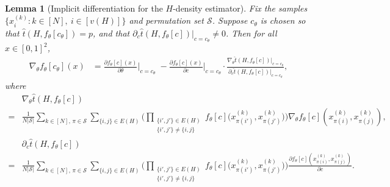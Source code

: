 \documentclass{article}
\theoremstyle{plain}
\newtheorem{lemma}{Lemma}[section]
\theoremstyle{definition}
\theoremstyle{remark}
\begin{document}
\begin{lemma}[Implicit differentiation for the $H$-density estimator]
\label{lem:implicitdifferentiation:Hdensity}
Fix the samples \(\{x_i^{(k)} : k\in[N],\ i\in[v(H)]\}\) and permutation set \(\mathcal{S}\). Suppose \(c_\theta\) is chosen so that
\(\widehat{t}(H,f_\theta[c_\theta]) = p\), and that \(\partial_c\widehat{t}(H,f_\theta[c])\big|_{c=c_\theta} \neq 0\).
Then for all \(x \in [0,1]^2\),
\begin{align*}
\nabla_\theta f_\theta[c_\theta](x)
&= \frac{\partial f_\theta[c](x)}{\partial \theta}\Big|_{c=c_\theta}
\;-
\frac{\partial f_\theta[c](x)}{\partial c}\Big|_{c=c_\theta}
\cdot
\frac{\nabla_\theta\widehat{t}(H,f_\theta[c])\big|_{c=c_\theta}}{\partial_c\widehat{t}(H,f_\theta[c])\big|_{c=c_\theta}},
\end{align*}
where
\begin{align*}
&\nabla_\theta\widehat{t}(H,f_\theta[c])
\\
{} = &\frac{1}{N|\mathcal{S}|}
\sum_{k\in[N],\,\pi\in\mathcal{S}}
\sum_{\{i,j\}\in E(H)}
\Bigg(\prod_{\substack{\{i',j'\}\in E(H)\\ \{i',j'\}\neq\{i,j\}}}
f_\theta[c]\bigl(x_{\pi(i')}^{(k)},x_{\pi(j')}^{(k)}\bigr)\Bigg)
\nabla_\theta f_\theta[c](x_{\pi(i)}^{(k)},x_{\pi(j)}^{(k)}),
\\
&\partial_c\widehat{t}(H,f_\theta[c])
\\
{} = &\frac{1}{N|\mathcal{S}|}
\sum_{k\in[N],\,\pi\in\mathcal{S}}
\sum_{\{i,j\}\in E(H)}
\Bigg(\prod_{\substack{\{i',j'\}\in E(H)\\ \{i',j'\}\neq\{i,j\}}}
f_\theta[c]\bigl(x_{\pi(i')}^{(k)},x_{\pi(j')}^{(k)}\bigr)\Bigg)
\frac{\partial f_\theta[c](x_{\pi(i)}^{(k)},x_{\pi(j)}^{(k)})}{\partial c}.
\end{align*}
\end{lemma}
\end{document}
